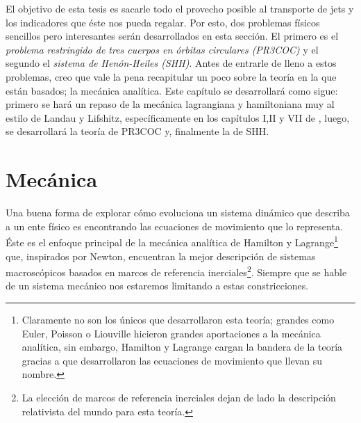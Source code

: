 
El objetivo de esta tesis es sacarle todo el provecho posible al transporte de jets y los indicadores que éste nos pueda regalar. Por esto, dos problemas físicos sencillos pero interesantes serán desarrollados en esta sección. El primero es el \textit{problema restringido de tres cuerpos en órbitas circulares (PR3COC)} y el segundo el \textit{sistema de Henón-Heiles (SHH)}. Antes de entrarle de lleno a estos problemas, creo que vale la pena recapitular un poco sobre la teoría en la que están basados; la mecánica analítica. Este capítulo se desarrollará como sigue: primero se hará un repaso de la mecánica lagrangiana y hamiltoniana muy al estilo de Landau y Lifshitz, específicamente en los capítulos I,II y VII de \cite{mechanics_landau_lifshitz}, luego, se desarrollará la teoría de PR3COC y, finalmente la de SHH.

\section{Mecánica}
\label{sec:mecanica}

Una buena forma de explorar cómo evoluciona un sistema dinámico que describa a un ente físico es encontrando las ecuaciones de movimiento que lo representa. Éste es el enfoque principal de la mecánica analítica de Hamilton y Lagrange\footnote{Claramente no son los únicos que desarrollaron esta teoría; grandes como Euler, Poisson o Liouville hicieron grandes aportaciones a la mecánica analítica, sin embargo, Hamilton y Lagrange cargan la bandera de la teoría gracias a que desarrollaron las ecuaciones de movimiento que llevan su nombre.} que, inspirados por Newton, encuentran la mejor descripción de sistemas macroscópicos basados en marcos de referencia inerciales\footnote{La elección de marcos de referencia inerciales dejan de lado la descripción relativista del mundo para esta teoría.}. Siempre que se hable de un sistema mecánico nos estaremos limitando a estas constricciones. 

